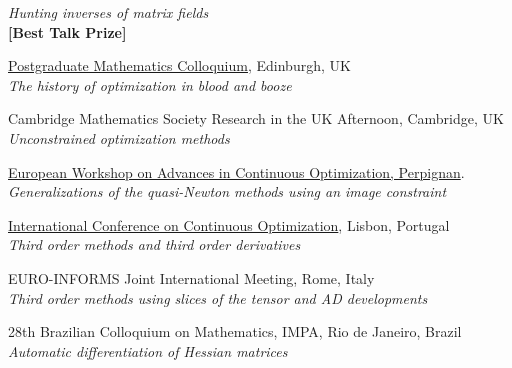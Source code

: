 \begin{bibsection}
 \emph{Hunting inverses of matrix fields}  \\
  {\bf [Best Talk Prize]} 
 \item \href{https://info.maths.ed.ac.uk/pg-pages/colloquium/colloquium_1415_1.html}{Postgraduate Mathematics Colloquium}, Edinburgh, UK\\
\emph{The history of optimization in blood and booze}
\item	  Cambridge Mathematics Society Research in the UK Afternoon, Cambridge, UK \\  \emph{Unconstrained optimization methods}
 \item \href{http://europt2014.univ-perp.fr/}{European Workshop
on Advances in Continuous Optimization, Perpignan}. \\ 
 \emph{Generalizations of the quasi-Newton methods using an image constraint}
\item[ 2013]
 \href{http://www.norg.uminho.pt/iccopt2013-SP-contents/wed_b_23.htm}{ International Conference on Continuous Optimization}, Lisbon, Portugal \\
\emph{Third order methods and third order derivatives} 
\item EURO-INFORMS Joint International Meeting, Rome, Italy \\
 \emph{Third order methods using slices of the tensor and AD developments}
\item[ 2011]
28th Brazilian Colloquium on Mathematics, IMPA, Rio de Janeiro, Brazil \\ \emph{Automatic differentiation of Hessian matrices}
\end{bibsection}	
% 
%
